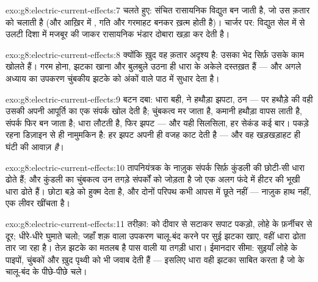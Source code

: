 \begin{solution}{exo:g8:electric-current-effects:7}
चलते हुए: संचित रासायनिक  विद्युत  बन जाती है, जो उस क़तार
को चलाती है (और आख़िर में , गति और गरमाहट बनकर ख़त्म होती है)।
चार्जर पर: विद्युत  सेल में से उलटी दिशा में मजबूर की जाकर
रासायनिक भंडार दोबारा खड़ा कर देती है।
\end{solution}

\begin{solution}{exo:g8:electric-current-effects:8}
क्योंकि ख़ुद वह क़तार अदृश्य है: उसका भेद सिर्फ़ उसके काम खोलते हैं।
गरम होना, झटका खाना और बुलबुले उठना ही धारा के अकेले दस्तख़त हैं ---
और अगले अध्याय का उपकरण चुंबकीय झटके को अंकों वाले पाठ में सुधार देता
है।
\end{solution}

\begin{solution}{exo:g8:electric-current-effects:9}
बटन दबा: धारा बही,  ने हथौड़ा झपटा, ठन --- पर हथौड़े की
वही  उसकी अपनी आपूर्ति का एक संपर्क खोल देती है; चुंबकत्व मर जाता
है, कमानी हथौड़ा वापस लाती है, संपर्क फिर बन जाता है; धारा लौटती है,
फिर झपट --- और यही सिलसिला, हर सेकंड कई बार। पकड़े रहना डिज़ाइन से ही
नामुमकिन है: हर झपट अपनी ही वजह काट देती है --- और वह खड़खड़ाहट ही
घंटी की आवाज़ \emph{है}।
\end{solution}

\begin{solution}{exo:g8:electric-current-effects:10}
तापनियंत्रक के नाज़ुक संपर्क सिर्फ़ कुंडली की छोटी-सी धारा ढोते हैं;
और कुंडली का चुंबकत्व उन तगड़े संपर्कों को जोड़ता है जो एक अलग फंदे
में हीटर की भूखी धारा ढोते हैं। छोटा बड़े को हुक्म देता है, और दोनों
परिपथ कभी आपस में छूते नहीं --- नाज़ुक हाथ  नहीं, एक लीवर खींचता
है।
\end{solution}

\begin{solution}{exo:g8:electric-current-effects:11}
तरीक़ा:  को दीवार से सटाकर सपाट पकड़ो, लोहे के फ़र्नीचर से
दूर; धीरे-धीरे घुमाते चलो; जहाँ शक़ वाला उपकरण चालू-बंद करने पर सुई
झटका खाए, वहीं धारा ढोता तार जा रहा है। तेज़ झटके का मतलब है पास वाली
या तगड़ी धारा। ईमानदार सीमा: सुइयाँ लोहे के पाइपों, चुंबकों और ख़ुद
पृथ्वी को भी जवाब देती हैं --- इसलिए धारा वही झटका साबित करता है जो
 के चालू-बंद के पीछे-पीछे चले।
\end{solution}

